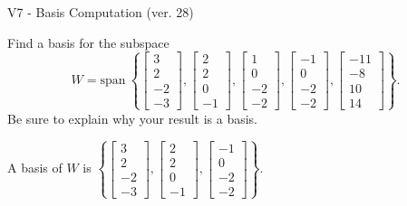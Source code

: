\begin{exercise}
  \begin{exerciseTitle}V7 - Basis Computation (ver. 28)\end{exerciseTitle}
  \begin{exerciseStatement}
    Find a basis for the subspace 
\[W=\mathrm{span}\ \left\{\left[\begin{array}{r}
3 \\
2 \\
-2 \\
-3
\end{array}\right] , \left[\begin{array}{r}
2 \\
2 \\
0 \\
-1
\end{array}\right] , \left[\begin{array}{r}
1 \\
0 \\
-2 \\
-2
\end{array}\right] , \left[\begin{array}{r}
-1 \\
0 \\
-2 \\
-2
\end{array}\right] , \left[\begin{array}{r}
-11 \\
-8 \\
10 \\
14
\end{array}\right]\right\}.\]
 Be sure to explain why your result is a basis.


  \end{exerciseStatement}
  \begin{exerciseAnswer}
   A basis of \(W\) is  \(\left\{\left[\begin{array}{r}
3 \\
2 \\
-2 \\
-3
\end{array}\right] , \left[\begin{array}{r}
2 \\
2 \\
0 \\
-1
\end{array}\right] , \left[\begin{array}{r}
-1 \\
0 \\
-2 \\
-2
\end{array}\right]\right\}\).
  


  \end{exerciseAnswer}
\end{exercise}